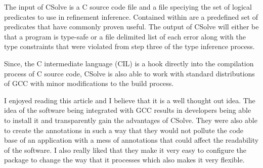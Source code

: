 The input of CSolve is a C source code file and a file speciying the set of logical predicates to use in refinement inference. Contained within are a predefined set of predicates that have commonly proven useful. The output of CSolve will either be that a program is type-safe or a file delimited list of each error along with the type constraints that were violated from step three of the type inference process.

Since, the C intermediate language (CIL) is a hook directly into the compilation process of C source code, CSolve is also able to work with standard distributions of GCC with minor modifications to the build process.

I enjoyed reading this article and I believe that it is a well thought out idea.  The idea of the software being integrated with GCC results in developers being able to install it and transparently gain the advantages of CSolve.  They were also able to create the annotations in such a way that they would not pollute the code base of an application with a mess of annotations that could affect the readability of the software.  I also really liked that they make it very easy to configure the package to change the way that it processes which also makes it very flexible.

% 


